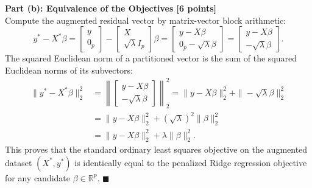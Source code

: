 \documentclass[11pt,a4paper]{article}
\begin{document}
\vspace{4pt}
\textbf{Part (b): Equivalence of the Objectives [6 points]} \\
Compute the augmented residual vector by matrix-vector block arithmetic:
\[
  y^* - X^* \beta = \begin{bmatrix} y \\ 0_p \end{bmatrix} - \begin{bmatrix} X \\ \sqrt{\lambda} I_p \end{bmatrix} \beta = \begin{bmatrix} y - X\beta \\ 0_p - \sqrt{\lambda} \beta \end{bmatrix} = \begin{bmatrix} y - X\beta \\ -\sqrt{\lambda} \beta \end{bmatrix}.
\]
The squared Euclidean norm of a partitioned vector is the sum of the squared Euclidean norms of its subvectors:
\begin{align*}
  \|y^* - X^* \beta\|_2^2 &= \left\| \begin{bmatrix} y - X\beta \\ -\sqrt{\lambda} \beta \end{bmatrix} \right\|_2^2 = \|y - X\beta\|_2^2 + \|-\sqrt{\lambda} \beta\|_2^2 \\
  &= \|y - X\beta\|_2^2 + (\sqrt{\lambda})^2 \|\beta\|_2^2 \\
  &= \|y - X\beta\|_2^2 + \lambda \|\beta\|_2^2.
\end{align*}
This proves that the standard ordinary least squares objective on the augmented dataset $(X^*, y^*)$ is identically equal to the penalized Ridge regression objective for any candidate $\beta \in \mathbb{R}^p$. $\blacksquare$
\end{document}
